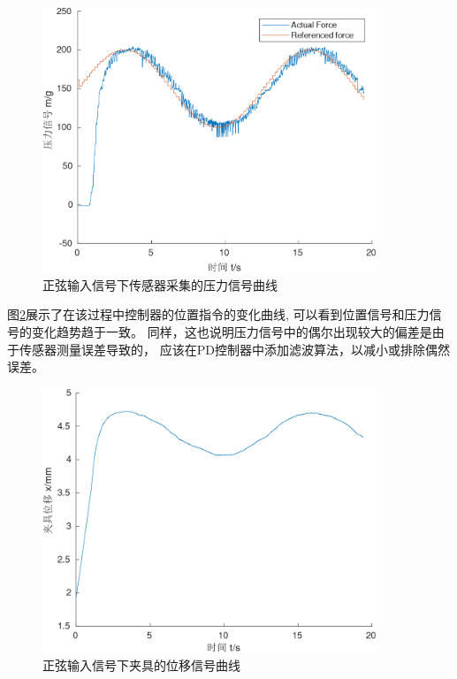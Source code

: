 \begin{figure}[!ht]
  \centering
  \includegraphics[width=10cm]{chapter04/pic/sin}
  \caption{\label{fig:sin}
    正弦输入信号下传感器采集的压力信号曲线}
  \vspace{-0.3cm}
\end{figure}

图\ref{fig:sin_x}展示了在该过程中控制器的位置指令的变化曲线,
可以看到位置信号和压力信号的变化趋势趋于一致。
同样，这也说明压力信号中的偶尔出现较大的偏差是由于传感器测量误差导致的，
应该在PD控制器中添加滤波算法，以减小或排除偶然误差。

\begin{figure}[!ht]
  \centering
  \includegraphics[width=10cm]{chapter04/pic/sin_x}
  \caption{\label{fig:sin_x}
    正弦输入信号下夹具的位移信号曲线}
  \vspace{-0.3cm}
\end{figure}

